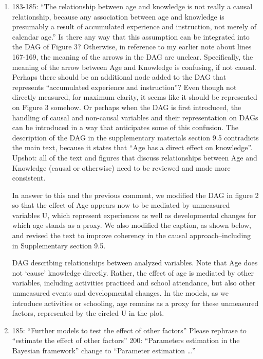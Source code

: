 \documentclass{article}
\newcommand{\rev}[1]{{\color{Red}#1}}
\newcommand{\comment}[1]{{\color{Blue}#1}}
\begin{document}
\begin{enumerate}
    \item \label{itm:dag}183-185: “The relationship between age and knowledge is not really a causal relationship, because any association between age and knowledge is presumably a result of accumulated experience and instruction, not merely of calendar age.” Is there any way that this assumption can be integrated into the DAG of Figure 3? Otherwise, in reference to my earlier note about lines 167-169, the meaning of the arrows in the DAG are unclear. Specifically, the meaning of the arrow between Age and Knowledge is confusing, if not causal. Perhaps there should be an additional node added to the DAG that represents “accumulated experience and instruction”? Even though not directly measured, for maximum clarity, it seems like it should be represented on Figure 3 somehow. Or perhaps when the DAG is first introduced, the handling of causal and non-causal variables and their representation on DAGs can be introduced in a way that anticipates some of this confusion. The description of the DAG in the supplementary materials section 9.5 contradicts the main text, because it states that “Age has a direct effect on knowledge”. Upshot: all of the text and figures that discuss relationships between Age and Knowledge (causal or otherwise) need to be reviewed and made more consistent.
    
    \comment{In answer to this and the previous comment, we modified the DAG in figure 2 so that the effect of Age appears now to be mediated by unmeasured variables U, which represent experiences as well as developmental changes for which age stands as a proxy. We also modified the caption, as shown below, and revised the text to improve coherency in the causal approach--including in Supplementary section 9.5. }
    
    \rev{DAG describing relationships between analyzed variables. Note that Age does not `cause' knowledge directly. Rather, the effect of age is mediated by other variables, including activities practiced and school attendance, but also other unmeasured events and developmental changes. In the models, as we introduce activities or schooling, age remains as a proxy for these unmeasured factors, represented by the circled U in the plot. }

    \item 185: “Further models to test the effect of other factors” Please rephrase to “estimate the effect of other factors” 200: “Parameters estimation in the Bayesian framework” change to “Parameter estimation …”
    

\end{enumerate}
\end{document}
